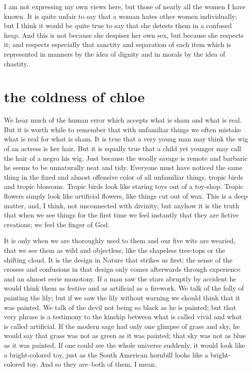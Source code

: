 \documentclass[final,10pt,letterpaper,twocolumn,openany]{book}
\begin{document}
I am not expressing my own views here, but those of nearly all the
women I have known. It is quite unfair to say that a woman hates other
women individually; but I think it would be quite true to say that she
detests them in a confused heap. And this is not because she despises her
own sex, but because she respects it; and respects especially that sanctity
and separation of each item which is represented in manners by the idea of
dignity and in morals by the idea of chastity.

\section{the coldness of chloe}

    We hear much of the human error which accepts what is sham and
what is real. But it is worth while to remember that with unfamiliar things
we often mistake what is real for what is sham. It is true that a very young
man may think the wig of an actress is her hair. But it is equally true that a
child yet younger may call the hair of a negro his wig. Just because the
woolly savage is remote and barbaric he seems to be unnaturally neat and
tidy. Everyone must have noticed the same thing in the fixed and almost
offensive color of all unfamiliar things, tropic birds and tropic blossoms.
Tropic birds look like staring toys out of a toy-shop. Tropic flowers simply
look like artificial flowers, like things cut out of wax. This is a deep matter,
and, I think, not unconnected with divinity; but anyhow it is the truth that
when we see things for the first time we feel instantly that they are fictive
creations; we feel the finger of God. 

It is only when we are thoroughly
used to them and our five wits are wearied, that we see them as wild and
objectless; like the shapeless tree-tops or the shifting cloud. It is the design
in Nature that strikes us first; the sense of the crosses and confusions in
that design only comes afterwards through experience and an almost eerie
monotony. If a man saw the stars abruptly by accident he would think
them as festive and as artificial as a firework. We talk of the folly of
painting the lily; but if we saw the lily without warning we should think
that it was painted. We talk of the devil not being so black as he is painted;
but that very phrase is a testimony to the kinship between what is called
vivid and what is called artificial. If the modern sage had only one glimpse
of grass and sky, he would say that grass was not as green as it was
painted; that sky was not as blue as it was painted. If one could see the
whole universe suddenly, it would look like a bright-colored toy, just as
the South American hornbill looks like a bright-colored toy. And so they
are--both of them, I mean.
\end{document}
